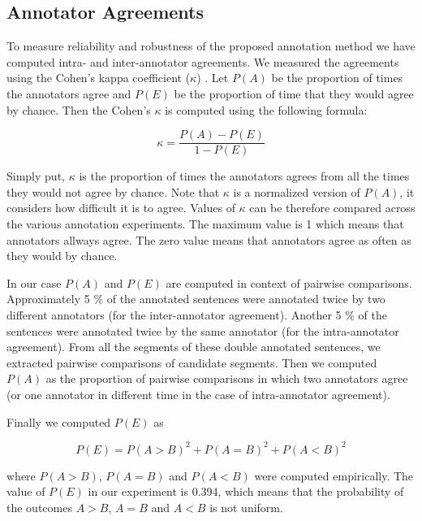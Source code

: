 \subsection{Annotator Agreements}

To measure reliability and robustness of the proposed annotation method we have
computed intra- and inter-annotator agreements.   We measured the agreements
using the Cohen's kappa coefficient ($\kappa$) . Let $P(A)$
be the proportion of times the annotators agree and $P(E)$ be the proportion of
time that they would agree by chance. Then the Cohen's $\kappa$ is computed
using the following formula:

\begin{equation*}
    \kappa = \frac{P(A)-P(E)}{1-P(E)}
\end{equation*}

\noindent Simply put, $\kappa$ is the proportion of times the annotators agrees
from all the times they would not agree by chance. Note that $\kappa$ is a
normalized version of $P(A)$, it considers how difficult it is to agree.
Values of $\kappa$ can be therefore compared across the various annotation
experiments. The maximum value is 1 which means that annotators allways agree.
The zero value means that annotators agree as often as they would by chance.

In our case $P(A)$ and $P(E)$ are computed in context of pairwise comparisons.
Approximately 5 \% of the annotated sentences were annotated twice by two
different annotators (for the inter-annotator agreement).  Another 5 \% of the
sentences were annotated twice by the same annotator (for the intra-annotator
agreement). From all the segments of these double annotated sentences, we
extracted pairwise comparisons of candidate segments. Then we computed $P(A)$
as the proportion of pairwise comparisons in which two annotators agree (or one
annotator in different time in the case of intra-annotator agreement). 

Finally we computed $P(E)$ as 

\begin{equation*}
    P(E) = P(A>B)^2 + P(A=B)^2 + P(A<B)^2
\end{equation*}

\noindent where $P(A>B)$, $P(A=B)$ and $P(A<B)$ were computed empirically. The
value of $P(E)$ in our experiment is 0.394, which means that the probability of
the outcomes $A>B$, $A=B$ and $A<B$ is not uniform.

